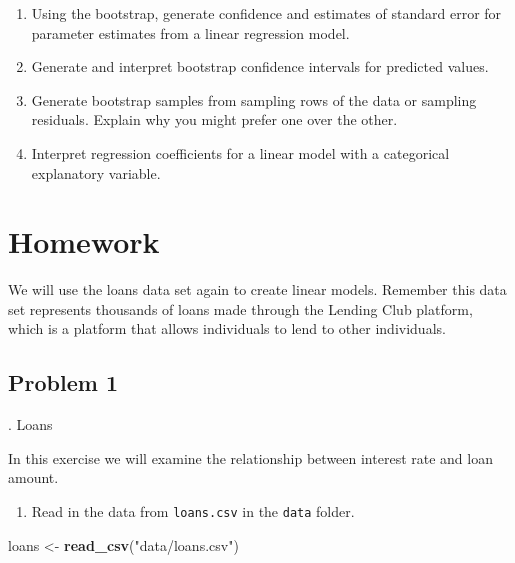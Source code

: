 \documentclass[
]{book}
\newenvironment{Shaded}{\begin{snugshade}}{\end{snugshade}}
\newcommand{\KeywordTok}[1]{\textcolor[rgb]{0.13,0.29,0.53}{\textbf{#1}}}
\newcommand{\NormalTok}[1]{#1}
\newcommand{\StringTok}[1]{\textcolor[rgb]{0.31,0.60,0.02}{#1}}
\providecommand{\tightlist}{%
  \setlength{\itemsep}{0pt}\setlength{\parskip}{0pt}}
\begin{document}
\begin{enumerate}
\def\labelenumi{\arabic{enumi})}
\tightlist
\item
  Using the bootstrap, generate confidence and estimates of standard error for parameter estimates from a linear regression model.\\
\item
  Generate and interpret bootstrap confidence intervals for predicted values.\\
\item
  Generate bootstrap samples from sampling rows of the data or sampling residuals. Explain why you might prefer one over the other.\\
\item
  Interpret regression coefficients for a linear model with a categorical explanatory variable.
\end{enumerate}

\hypertarget{homework-28}{%
\section{Homework}\label{homework-28}}

We will use the loans data set again to create linear models. Remember this data set represents thousands of loans made through the Lending Club platform, which is a platform that allows individuals to lend to other individuals.

\hypertarget{problem-1-28}{%
\subsection{Problem 1}\label{problem-1-28}}

. Loans

In this exercise we will examine the relationship between interest rate and loan amount.

\begin{enumerate}
\def\labelenumi{\alph{enumi}.}
\tightlist
\item
  Read in the data from \texttt{loans.csv} in the \texttt{data} folder.
\end{enumerate}

\begin{Shaded}
\begin{Highlighting}[]
\NormalTok{loans <-}\StringTok{ }\KeywordTok{read_csv}\NormalTok{(}\StringTok{"data/loans.csv"}\NormalTok{)}
\end{Highlighting}
\end{Shaded}
\end{document}
